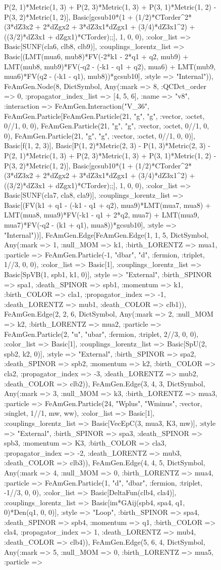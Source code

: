\documentclass{revtex4}
\begin{document}
\begin{figure}[!htb]
\begin{center}
{P(2, 1)*Metric(1, 3) + P(2, 3)*Metric(1, 3) + P(3, 1)*Metric(1, 2) - P(3, 2)*Metric(1, 2)], Basic[gcsub10*(1 + (1/2)*CTorder^2*(3*dZ3x2 + 2*dZgx2 + 3*dZ3x1*dZgx1 + (3/4)*dZ3x1^2) + ((3/2)*dZ3x1 + dZgx1)*CTorder);;], 1, 0, 0), :color_list => Basic[SUNF(cla6, clb8, clb9)], :couplings_lorentz_list => Basic[(LMT(mua6, mub8)*FV(-2*k1 - 2*q1 + q2, mub9) + LMT(mub8, mub9)*FV(-q2 - (-k1 - q1 + q2), mua6) + LMT(mub9, mua6)*FV(q2 - (-k1 - q1), mub8))*gcsub10], :style => "Internal")), FeAmGen.Node(8, Dict{Symbol, Any}(:mark => 8, :QCDct_order => 0, :propagator_index_list => [4, 5, 6], :name => "v8", :interaction => FeAmGen.Interaction("V_36", FeAmGen.Particle[FeAmGen.Particle(21, "g", "g", :vector, :octet, 0//1, 0, 0), FeAmGen.Particle(21, "g", "g", :vector, :octet, 0//1, 0, 0), FeAmGen.Particle(21, "g", "g", :vector, :octet, 0//1, 0, 0)], Basic[f(1, 2, 3)], Basic[P(1, 2)*Metric(2, 3) - P(1, 3)*Metric(2, 3) - P(2, 1)*Metric(1, 3) + P(2, 3)*Metric(1, 3) + P(3, 1)*Metric(1, 2) - P(3, 2)*Metric(1, 2)], Basic[gcsub10*(1 + (1/2)*CTorder^2*(3*dZ3x2 + 2*dZgx2 + 3*dZ3x1*dZgx1 + (3/4)*dZ3x1^2) + ((3/2)*dZ3x1 + dZgx1)*CTorder);;], 1, 0, 0), :color_list => Basic[SUNF(cla7, cla8, cla9)], :couplings_lorentz_list => Basic[(FV(k1 + q1 - (-k1 - q1 + q2), mua9)*LMT(mua7, mua8) + LMT(mua8, mua9)*FV(-k1 - q1 + 2*q2, mua7) + LMT(mua9, mua7)*FV(-q2 - (k1 + q1), mua8))*gcsub10], :style => "Internal"))], FeAmGen.Edge[FeAmGen.Edge(1, 1, 5, Dict{Symbol, Any}(:mark => 1, :null_MOM => k1, :birth_LORENTZ => mua1, :particle => FeAmGen.Particle(-1, "dbar", "d", :fermion, :triplet, 1//3, 0, 0), :color_list => Basic[1], :couplings_lorentz_list => Basic[SpVB(1, spb1, k1, 0)], :style => "External", :birth_SPINOR => spa1, :death_SPINOR => spb1, :momentum => k1, :birth_COLOR => cla1, :propagator_index => -1, :death_LORENTZ => mub1, :death_COLOR => clb1)), FeAmGen.Edge(2, 2, 6, Dict{Symbol, Any}(:mark => 2, :null_MOM => k2, :birth_LORENTZ => mua2, :particle => FeAmGen.Particle(2, "u", "ubar", :fermion, :triplet, 2//3, 0, 0), :color_list => Basic[1], :couplings_lorentz_list => Basic[SpU(2, spb2, k2, 0)], :style => "External", :birth_SPINOR => spa2, :death_SPINOR => spb2, :momentum => k2, :birth_COLOR => cla2, :propagator_index => -3, :death_LORENTZ => mub2, :death_COLOR => clb2)), FeAmGen.Edge(3, 4, 3, Dict{Symbol, Any}(:mark => 3, :null_MOM => k3, :birth_LORENTZ => mua3, :particle => FeAmGen.Particle(24, "Wplus", "Wminus", :vector, :singlet, 1//1, mw, ww), :color_list => Basic[1], :couplings_lorentz_list => Basic[VecEpC(3, mua3, K3, mw)], :style => "External", :birth_SPINOR => spa3, :death_SPINOR => spb3, :momentum => K3, :birth_COLOR => cla3, :propagator_index => -2, :death_LORENTZ => mub3, :death_COLOR => clb3)), FeAmGen.Edge(4, 4, 5, Dict{Symbol, Any}(:mark => 4, :null_MOM => 0, :birth_LORENTZ => mua4, :particle => FeAmGen.Particle(1, "d", "dbar", :fermion, :triplet, -1//3, 0, 0), :color_list => Basic[DeltaFun(clb4, cla4)], :couplings_lorentz_list => Basic[im*GAij(spb4, spa4, q1, 0)*Den(q1, 0, 0)], :style => "Loop", :birth_SPINOR => spa4, :death_SPINOR => spb4, :momentum => q1, :birth_COLOR => cla4, :propagator_index => 1, :death_LORENTZ => mub4, :death_COLOR => clb4)), FeAmGen.Edge(5, 6, 4, Dict{Symbol, Any}(:mark => 5, :null_MOM => 0, :birth_LORENTZ => mua5, :particle => }
\end{center}
\end{figure}
\end{document}
